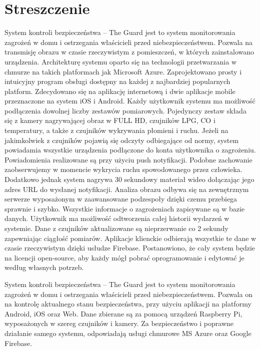 \chapter{Streszczenie}

System kontroli bezpieczeństwa – The Guard jest to system monitorowania zagrożeń w domu i ostrzegania właścicieli przed niebezpieczeństwem. Pozwala na transmisję obrazu w czasie rzeczywistym z pomieszczeń, w których zainstalowano urządzenia. Architekturę systemu oparto się na technologii przetwarzania w chmurze na takich platformach jak Microsoft Azure. Zaprojektowano prosty i intuicyjny program obsługi dostępny na każdej z najbardziej popularnych platform. Zdecydowano się na aplikację internetową i dwie aplikacje mobile przeznaczone na system iOS i Android. Każdy użytkownik systemu ma możliwość podłączenia dowolnej liczby zestawów pomiarowych. Pojedynczy zestaw składa się z kamery nagrywającej obraz w FULL HD, czujników LPG, CO i temperatury, a także z czujników wykrywania płomieni i ruchu. Jeżeli na jakimkolwiek z czujników pojawią się odczyty odbiegające od normy, system powiadamia wszystkie urządzenia podłączone do konta użytkownika o zagrożeniu. Powiadomienia realizowane są przy użyciu push notyfikacji. 
Podobne zachowanie zaobserwujemy w momencie wykrycia ruchu spowodowanego przez człowieka. Dodatkowo jednak system nagrywa 30 sekundowy materiał wideo dołączając jego adres URL do wysłanej notyfikacji. Analiza obrazu odbywa się na zewnętrznym serwerze wyposażonym w zaawansowane podzespoły dzięki czemu przebiega sprawnie i szybko. Wszystkie informacje o zagrożeniach zapisywane są w bazie danych. Użytkownik ma możliwość odtworzenia całej historii wydarzeń w systemie. Dane z czujników aktualizowane są nieprzerwanie co 2 sekundy zapewniając ciągłość pomiarów. Aplikacje klienckie odbierają wszystkie te dane w czasie rzeczywistym dzięki usłudze Firebase. Postanowiono, że cały system będzie na licencji open-source, aby każdy mógł pobrać oprogramowanie i edytować je według własnych potrzeb.




System kontroli bezpieczeństwa – The Guard jest to system monitorowania zagrożeń w domu i ostrzegania właścicieli przed niebezpieczeństwem. Pozwala on na kontrolę aktualnego stanu bezpieczeństwa, przy użyciu aplikacji na platformy Android, iOS oraz Web. Dane zbierane są za pomocą urządzeń Raspberry Pi, wyposażonych w szereg czujników i kamery. Za bezpieczeństwo i poprawne działanie samego systemu, odpowiadają usługi chmurowe MS Azure oraz Google Firebase. 
